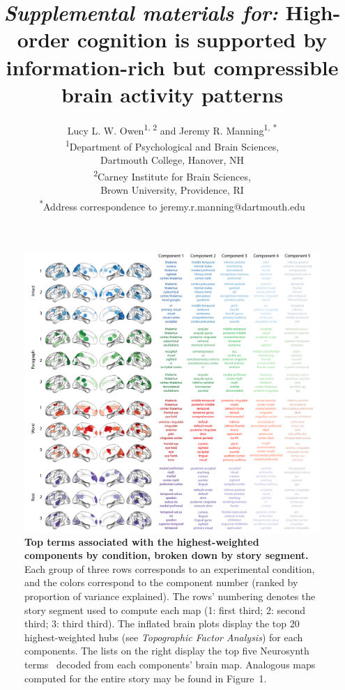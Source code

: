 \documentclass[english]{article}
\title{\textit{Supplemental materials for:} High-order cognition is supported by information-rich but compressible brain activity patterns}
\author{Lucy L. W. Owen\textsuperscript{1, 2} and Jeremy R. Manning\textsuperscript{1,
*}\\\textsuperscript{1}Department of Psychological and Brain Sciences,\\Dartmouth College,
Hanover, NH\\[0.1cm]\textsuperscript{2}Carney Institute for Brain Sciences,\\Brown University,
Providence, RI\\[0.1cm] \textsuperscript{*}Address correspondence to
jeremy.r.manning@dartmouth.edu}
\newcommand{\synth}{1}
\begin{document}
\maketitle


\begin{figure}
  \centering
  \includegraphics[width=\textwidth]{figs/pca_neurosynth_thirds}

\caption{\textbf{Top terms associated with the highest-weighted components by
condition, broken down by story segment.} Each group of three rows corresponds
to an experimental condition, and the colors correspond to the component number
(ranked by proportion of variance explained). The rows' numbering denotes the
story segment used to compute each map (1: first third; 2: second third; 3:
third third). The inflated brain plots display the top 20 highest-weighted hubs
(see \textit{Topographic Factor Analysis}) for each components. The lists on
the right display the top five Neurosynth terms~\citep{RubiEtal17} decoded from
each components' brain map. Analogous maps computed for the entire story may be
found in Figure~\synth.}

\label{fig:neurosynth-thirds}

\end{figure}

\newpage
\renewcommand{\refname}{Supplemental references}


\end{document}
